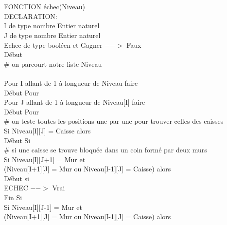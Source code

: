 \documentclass{article}
\begin{document}
\begin{tabbing}
\\
\\FONCTION échec(Niveau)
\\DECLARATION:
\\	\hspace{1cm} I de type nombre Entier naturel
\\\hspace{1cm}	J de type nombre Entier naturel
\\\hspace{1cm}	Echec de type booléen et Gagner $-->$ Faux
\\Début 
\\\hspace{1cm}	\# on parcourt notre liste Niveau 
\\
\\\hspace{1cm}	Pour I allant de 1 à longueur de Niveau faire
\\\hspace{1cm}	Début Pour
\\	\hspace{2cm}	Pour J allant de 1 à longueur de Niveau[I] faire
\\	\hspace{2cm}	Début Pour
\\	\hspace{3cm}		\# on teste toutes les positions une par une pour trouver celles des caisses 
\\	\hspace{3cm}		Si Niveau[I][J] = Caisse alors
\\	\hspace{3cm}		Début Si
\\	\hspace{3cm}		\# si une caisse se trouve bloquée dans un coin formé par deux murs
\\	\hspace{4cm}			Si Niveau[I][J+1] = Mur et
\\ \hspace{4cm} (Niveau[I+1][J] = Mur ou Niveau[I-1][J] = Caisse) alors
\\	\hspace{4cm}			Début si
\\	\hspace{5cm}				ECHEC $-->$ Vrai
\\	\hspace{4cm}			Fin Si
\\	\hspace{4cm}			Si Niveau[I][J-1] = Mur et
\\ \hspace{4cm} (Niveau[I+1][J] = Mur ou Niveau[I-1][J] = Caisse) alors

\end{tabbing}
\end{document}
